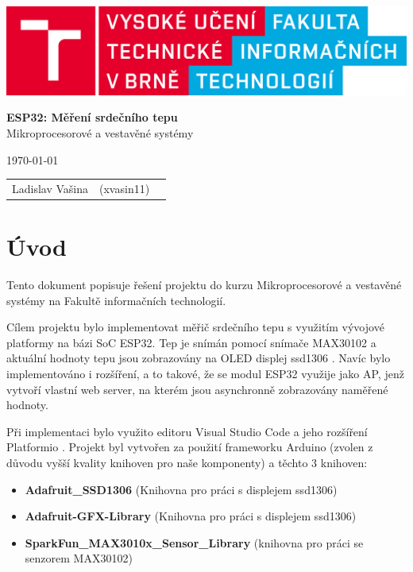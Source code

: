 \documentclass[12pt, a4paper]{article}
\begin{document}
	\begin{titlepage}
		\begin{center}
			\includegraphics[width=0.77\linewidth]{images/fit_logo.png} \\


			\Huge{\textbf{ESP32: Měření srdečního tepu}} \\ 
            \LARGE{Mikroprocesorové a vestavěné systémy}
		\end{center}

		\begin{minipage}{0.4 \textwidth}
			{\Large \today}
		\end{minipage}
		\hfill
		\begin{minipage}[r]{0.6 \textwidth}
			\Large
			\begin{tabular}{l l l}
				Ladislav Vašina & (xvasin11)
			\end{tabular}
		\end{minipage}
	\end{titlepage}
	
	\setcounter{page}{1}
	\tableofcontents
	\clearpage
	
    \section{Úvod}
    Tento dokument popisuje řešení projektu do kurzu Mikroprocesorové a vestavěné systémy na Fakultě informačních technologií. 
    
    Cílem projektu bylo implementovat měřič srdečního tepu s využitím vývojové platformy na bázi SoC ESP32. Tep je snímán pomocí snímače MAX30102 \cite{MAX30102} a aktuální hodnoty tepu jsou zobrazovány na OLED displej ssd1306 \cite{ssd1306}. Navíc bylo implementováno i rozšíření, a to takové, že se modul ESP32 využije jako AP, jenž vytvoří vlastní web server, na kterém jsou asynchronně zobrazovány naměřené hodnoty.

    Při implementaci bylo využito editoru Visual Studio Code a jeho rozšíření Platformio \cite{platformio}.
    Projekt byl vytvořen za použití frameworku Arduino (zvolen z důvodu vyšší kvality knihoven pro naše komponenty) a těchto 3 knihoven:
    \begin{itemize}
        \item \textbf{Adafruit\_SSD1306} \cite{adafruitSsd1306} (Knihovna pro práci s displejem ssd1306)
        \item \textbf{Adafruit-GFX-Library} \cite{adafruitGFX} (Knihovna pro práci s displejem ssd1306)
        \item \textbf{SparkFun\_MAX3010x\_Sensor\_Library} \cite{sparkfun} (knihovna pro práci se senzorem MAX30102)
    \end{itemize}
\end{document}
